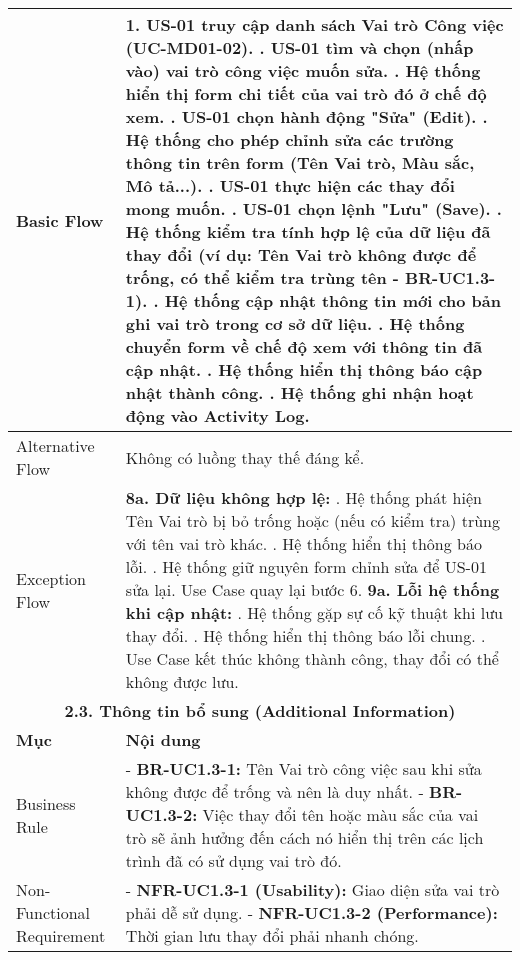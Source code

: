 \begin{longtable}{|m{4cm}|p{11cm}|}
Basic Flow & 1. US-01 truy cập danh sách Vai trò Công việc (UC-MD01-02). \newline 2. US-01 tìm và chọn (nhấp vào) vai trò công việc muốn sửa. \newline 3. Hệ thống hiển thị form chi tiết của vai trò đó ở chế độ xem. \newline 4. US-01 chọn hành động "Sửa" (Edit). \newline 5. Hệ thống cho phép chỉnh sửa các trường thông tin trên form (Tên Vai trò, Màu sắc, Mô tả...). \newline 6. US-01 thực hiện các thay đổi mong muốn. \newline 7. US-01 chọn lệnh "Lưu" (Save). \newline 8. Hệ thống kiểm tra tính hợp lệ của dữ liệu đã thay đổi (ví dụ: Tên Vai trò không được để trống, có thể kiểm tra trùng tên - BR-UC1.3-1). \newline 9. Hệ thống cập nhật thông tin mới cho bản ghi vai trò trong cơ sở dữ liệu. \newline 10. Hệ thống chuyển form về chế độ xem với thông tin đã cập nhật. \newline 11. Hệ thống hiển thị thông báo cập nhật thành công. \newline 12. Hệ thống ghi nhận hoạt động vào Activity Log. \\
\hline
Alternative Flow & Không có luồng thay thế đáng kể. \\
\hline
Exception Flow & \textbf{8a. Dữ liệu không hợp lệ:} \newline    1. Hệ thống phát hiện Tên Vai trò bị bỏ trống hoặc (nếu có kiểm tra) trùng với tên vai trò khác. \newline    2. Hệ thống hiển thị thông báo lỗi. \newline    3. Hệ thống giữ nguyên form chỉnh sửa để US-01 sửa lại. Use Case quay lại bước 6. \newline \textbf{9a. Lỗi hệ thống khi cập nhật:} \newline    1. Hệ thống gặp sự cố kỹ thuật khi lưu thay đổi. \newline    2. Hệ thống hiển thị thông báo lỗi chung. \newline    3. Use Case kết thúc không thành công, thay đổi có thể không được lưu. \\
\hline
\multicolumn{2}{|c|}{\textbf{2.3. Thông tin bổ sung (Additional Information)}} \\
\hline
\textbf{Mục} & \textbf{Nội dung} \\
\hline
Business Rule & - \textbf{BR-UC1.3-1:} Tên Vai trò công việc sau khi sửa không được để trống và nên là duy nhất. \newline - \textbf{BR-UC1.3-2:} Việc thay đổi tên hoặc màu sắc của vai trò sẽ ảnh hưởng đến cách nó hiển thị trên các lịch trình đã có sử dụng vai trò đó. \\
\hline
Non-Functional Requirement & - \textbf{NFR-UC1.3-1 (Usability):} Giao diện sửa vai trò phải dễ sử dụng. \newline - \textbf{NFR-UC1.3-2 (Performance):} Thời gian lưu thay đổi phải nhanh chóng. \\
\hline
\end{longtable}

